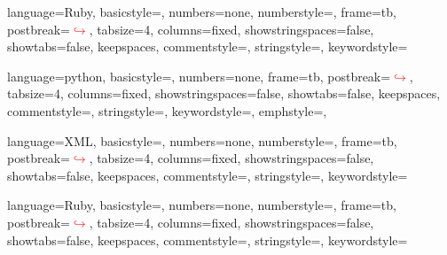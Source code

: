  {
	language=Ruby,		%
	basicstyle=\footnotesize\ttfamily,
	numbers=none,
	numberstyle=\tiny{},
	frame=tb,
	postbreak=\mbox{\textcolor{red}{$\hookrightarrow$}\space},
	tabsize=4,
	columns=fixed,
	showstringspaces=false,
	showtabs=false,
	keepspaces,
	commentstyle=\color{red},
	stringstyle=\color{gray},		%
	keywordstyle=\color{blue}
}


 {
	language=python,		%
	basicstyle=\footnotesize\ttfamily,
	numbers=none,
	frame=tb,
	postbreak=\mbox{\textcolor{red}{$\hookrightarrow$}\space},
	tabsize=4,
	columns=fixed,
	showstringspaces=false,
	showtabs=false,
	keepspaces,
	commentstyle=\color{gray},
	stringstyle=\color{brown},
	keywordstyle=\color{blue},
	emphstyle=\color{green},
}

 {
	language=XML,		%
	basicstyle=\footnotesize\ttfamily,
	numbers=none,
	numberstyle=\tiny{},
	frame=tb,
	postbreak=\mbox{\textcolor{red}{$\hookrightarrow$}\space},
	tabsize=4,
	columns=fixed,
	showstringspaces=false,
	showtabs=false,
	keepspaces,
	commentstyle=\color{red},
	stringstyle=\color{gray},		%
	keywordstyle=\color{blue}
}

 {
	language=Ruby,
	basicstyle=\scriptsize\ttfamily,
	numbers=none,
	numberstyle=\tiny{},
	frame=tb,
	postbreak=\mbox{\textcolor{red}{$\hookrightarrow$}\space},
	tabsize=4,
	columns=fixed,
	showstringspaces=false,
	showtabs=false,
	keepspaces,
	commentstyle=\color{black},
	stringstyle=\color{black},
	keywordstyle=\color{black}
}











